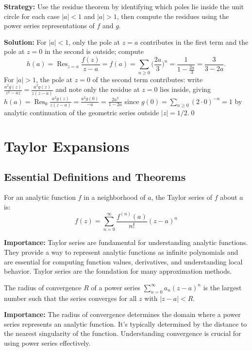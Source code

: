 \noindent\textbf{Strategy:} Use the residue theorem by identifying which poles lie inside the unit circle for each case \( |a| < 1 \) and \( |a| > 1 \), then compute the residues using the power series representations of \( f \) and \( g \).

\bigskip\noindent\textbf{Solution:}
For $|a|<1$, only the pole at $z=a$ contributes in the first term and the pole at $z=0$ in the second is outside; compute
\[h(a)=\operatorname{Res}_{z=a}\frac{f(z)}{z-a}=f(a)=\sum_{n\ge0}\Big(\frac{2a}{3}\Big)^n=\frac{1}{1-\frac{2a}{3}}=\frac{3}{3-2a}.
\]
For $|a|>1$, the pole at $z=0$ of the second term contributes: write $\frac{a^2g(z)}{z^2-az}=\frac{a^2g(z)}{z(z-a)}$ and note only the residue at $z=0$ lies inside, giving $h(a)=\operatorname{Res}_{0}\frac{a^2g(z)}{z(z-a)}=\frac{a^2g(0)}{-a}=\frac{2a^2}{1-2a}$ since $g(0)=\sum_{n\ge0} (2\cdot0)^{-n}=1$ by analytic continuation of the geometric series outside $|z|=1/2$.\qed
\section{Taylor Expansions}

\subsection*{Essential Definitions and Theorems}

\begin{definition}
For an analytic function $f$ in a neighborhood of $a$, the Taylor series of $f$ about $a$ is:
\[f(z) = \sum_{n=0}^{\infty} \frac{f^{(n)}(a)}{n!}(z-a)^n\]
\end{definition}

\noindent\textbf{Importance:} Taylor series are fundamental for understanding analytic functions. They provide a way to represent analytic functions as infinite polynomials and are essential for computing function values, derivatives, and understanding local behavior. Taylor series are the foundation for many approximation methods.



\begin{definition}
The radius of convergence $R$ of a power series $\sum_{n=0}^{\infty} a_n(z-a)^n$ is the largest number such that the series converges for all $z$ with $|z-a| < R$.
\end{definition}

\noindent\textbf{Importance:} The radius of convergence determines the domain where a power series represents an analytic function. It's typically determined by the distance to the nearest singularity of the function. Understanding convergence is crucial for using power series effectively.



